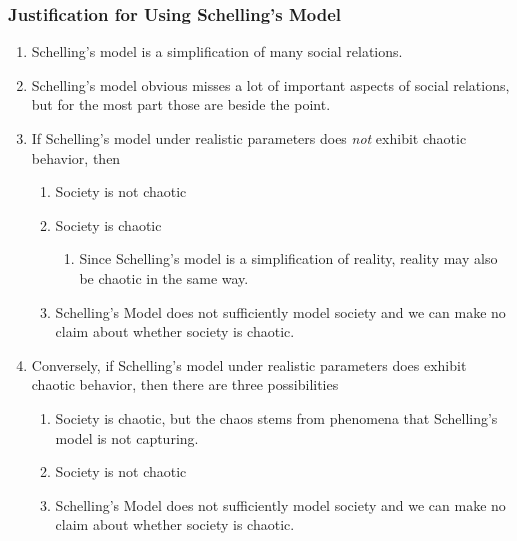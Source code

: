 \documentclass[11pt, handout]{beamer}
\begin{document}
\begin{frame}
\begin{figure}
        \end{figure}
\end{frame}


\begin{frame}
    \frametitle{Justification for Using Schelling's Model}
    \begin{enumerate}
        \item Schelling's model is a simplification of many social relations.
        \item Schelling's model obvious misses a lot of important aspects of social relations, but for the most part those are beside the point.
        \item If Schelling's model under realistic parameters does \emph{not} exhibit chaotic behavior, then
            \begin{enumerate}
                \item Society is not chaotic
                \item Society is chaotic
                    \begin{enumerate}
                        \item Since Schelling's model is a simplification of reality, reality may also be chaotic in the same way.
                    \end{enumerate}
                \item Schelling's Model does not sufficiently model society and we can make no claim about whether society is chaotic.
            \end{enumerate}
        \item Conversely, if Schelling's model under realistic parameters does exhibit chaotic behavior, then there are three possibilities
            \begin{enumerate}
                \item Society is chaotic, but the chaos stems from phenomena that Schelling's model is not capturing.
                \item Society is not chaotic
                \item Schelling's Model does not sufficiently model society and we can make no claim about whether society is chaotic.
            \end{enumerate}
    \end{enumerate}
\end{frame}
\end{document}
